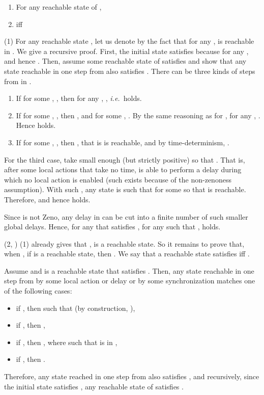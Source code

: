 \documentclass{LMCS}
\theoremstyle{plain}\newtheorem*{prop11}{Proposition~\ref{prop:states} bis}
\def\ie{{\em i.e.\ }}
\begin{document}
\begin{prop}\label{prop:reachable}\hfill
\begin{enumerate}
  \item For any reachable state  of ,\\
  
  \item  iff\\
  
  \end{enumerate}
\end{prop}
\proof (1) For any reachable state , let us denote by  the
  fact that for any ,  is reachable in
  . We give a recursive proof. First, the
  initial state  satisfies  because for any
  ,  and hence .
Then, assume some reachable state  of 
  satisfies  and show that any state  reachable in
  one step from  also satisfies .
  There can be three kinds of steps from  in .
  \begin{enumerate}
  \item If for some ,
    , then for any
    \mbox{},
    ,
    \ie  holds.
  \item If for some ,
    , then , and
    for some \mbox{},
    .
    By the same reasoning as for , for any
    , .
    Hence  holds.
  \item If for some ,
    , then
    ,
    that is  is reachable, and by time-determinism,
    .
  \end{enumerate}
  For the third case, take  small enough (but strictly positive) so that
  .
  That is, after some local actions that take no time,  is able to
  perform a delay  during which no local action is enabled (such 
  exists because  of the non-zenoness assumption). With such , any state
   is such that  for some  so
  that  is reachable. Therefore,
   and hence  holds.

  Since  is not Zeno, any delay in  can be cut into a
  finite number of such smaller global delays. Hence, for any  that
  satisfies , for any  such that
  ,  holds.


  (2, ) (1) already gives that
  ,  is a reachable state.
  So it remains to prove that, when ,
  if  is a reachable state, then
  . We say that a reachable state  satisfies
   iff .

  Assume  and  is a reachable
  state that satisfies .
  Then, any state  reachable in one step from  by some local action
  or delay  or by some synchronization
   matches one of the following cases:
  \begin{itemize}
    \item if , then 
    such that   (by construction,
    ),
    \item if , then ,
    \item if , then ,
    where  such that  is in
    ,
    \item if , then
    .
  \end{itemize}
  Therefore, any state  reached in one step from  also satisfies
  , and recursively, since the initial state
   satisfies , any reachable state
   of  satisfies .
\end{document}
